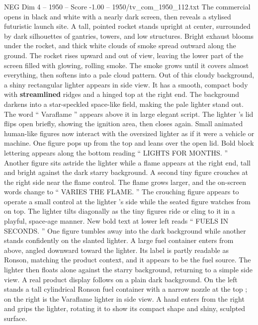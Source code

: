 \begin{textsample}{NEG Dim 4 – 1950 – Score -1.00 – 1950/tv\_com\_1950\_112.txt}  \label{ex:f4_neg_063}
The commercial opens in black and white with a nearly dark screen, then reveals a stylised futuristic launch site.
A tall, pointed rocket stands upright at center, surrounded by dark silhouettes of gantries, towers, and low structures.
Bright exhaust blooms under the rocket, and thick white clouds of smoke spread outward along the ground.
The rocket rises upward and out of view, leaving the lower part of the screen filled with glowing, rolling smoke.
The smoke grows until it covers almost everything, then softens into a pale cloud pattern.
Out of this cloudy background, a shiny rectangular lighter appears in side view.
It has a smooth, compact body with \textbf{streamlined} ridges and a hinged top at the right end.
The background darkens into a star-speckled space-like field, making the pale lighter stand out.
The word “ Varaflame ” appears above it in large elegant script.
The lighter ’s lid flips open briefly, showing the ignition area, then closes again.
Small animated human-like figures now interact with the oversized lighter as if it were a vehicle or machine.
One figure pops up from the top and leans over the open lid.
Bold block lettering appears along the bottom reading “ LIGHTS FOR MONTHS. ” Another figure sits astride the lighter while a flame appears at the right end, tall and bright against the dark starry background.
A second tiny figure crouches at the right side near the flame control.
The flame grows larger, and the on-screen words change to “ VARIES THE FLAME. ” The crouching figure appears to operate a small control at the lighter ’s side while the seated figure watches from on top.
The lighter tilts diagonally as the tiny figures ride or cling to it in a playful, space-age manner.
New bold text at lower left reads “ FUELS IN SECONDS. ” One figure tumbles away into the dark background while another stands confidently on the slanted lighter.
A large fuel container enters from above, angled downward toward the lighter.
Its label is partly readable as Ronson, matching the product context, and it appears to be the fuel source.
The lighter then floats alone against the starry background, returning to a simple side view.
A real product display follows on a plain dark background.
On the left stands a tall cylindrical Ronson fuel container with a narrow nozzle at the top ; on the right is the Varaflame lighter in side view.
A hand enters from the right and grips the lighter, rotating it to show its compact shape and shiny, sculpted surface.

\end{textsample}
